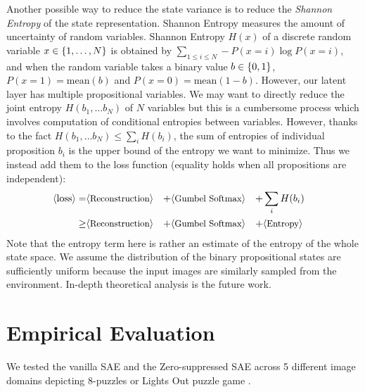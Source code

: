 Another possible way to reduce the state variance is to reduce the
\emph{Shannon Entropy} of the state representation.
Shannon Entropy measures the amount of uncertainty of random variables.
% 
Shannon Entropy $H(x)$ of a discrete random variable $x\in
{\left\{1,\ldots,N\right\}}$ is obtained by $\sum_{1\leq i \leq N} -P(x=i)\log
P(x=i)$, and when the random variable takes a binary value
$b\in{\left\{0,1\right\}}$, $P(x=1)=\text{mean}(b)$ and $P(x=0)=\text{mean}(1-b)$.
% 
However, our latent layer has multiple
propositional variables. 
We may want to directly reduce the joint entropy
$H(b_1,\ldots b_N)$ of $N$ variables but this is a cumbersome process which involves
computation of conditional entropies between variables.
However, thanks to the fact $H(b_1,\ldots b_N) \leq \sum_{i} H(b_i)$,
the sum of entropies of individual proposition $b_i$ is the upper bound of the entropy we want to minimize.
Thus we instead add them to the loss function (equality holds when all propositions are independent):
\begin{align*}
 \brackets{\text{loss}} =    & \brackets{\text{\small Reconstruction}} &+ & \brackets{\text{\small Gumbel Softmax}} &+ & \sum_{i} H(b_i)& \\
                        \geq & \brackets{\text{\small Reconstruction}} &+ & \brackets{\text{\small Gumbel Softmax}} &+ & \brackets{\text{\small Entropy}}
\end{align*}
Note that the entropy term here is rather an estimate of the entropy of the whole state space.
We assume the distribution of the binary propositional states are sufficiently uniform
because the input images are similarly sampled from the environment.
In-depth theoretical analysis is the future work.

\section{Empirical Evaluation}
\label{evaluation}

We tested the vanilla SAE and the Zero-suppressed SAE across 5 different
image domains depicting 8-puzzles or Lights Out puzzle game \cite{lightsout}.

